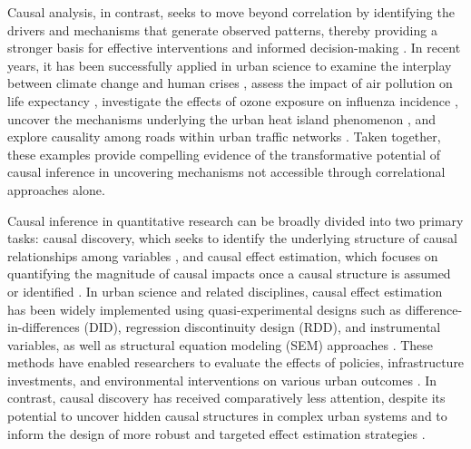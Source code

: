 \documentclass[authoryear,preprint,review,12pt]{elsarticle}
\begin{document}
Causal analysis, in contrast, seeks to move beyond correlation by identifying the drivers and mechanisms that generate observed patterns, thereby providing a stronger basis for effective interventions and informed decision-making \citep{niu2023mobility_intervention_policies,li2025city_carbon,fekete2025urban_transport}. In recent years, it has been successfully applied in urban science to examine the interplay between climate change and human crises \citep{zhang2011climate_change_human_crisis}, assess the impact of air pollution on life expectancy \citep{chen2013air_pollution_life_expectancy}, investigate the effects of ozone exposure on influenza incidence \citep{guo2024ozone_influenza}, uncover the mechanisms underlying the urban heat island phenomenon \citep{zhong2024urban_heat_island}, and explore causality among roads within urban traffic networks \citep{mao2024urban_traffic_networks}. Taken together, these examples provide compelling evidence of the transformative potential of causal inference in uncovering mechanisms not accessible through correlational approaches alone.

Causal inference in quantitative research can be broadly divided into two primary tasks: causal discovery, which seeks to identify the underlying structure of causal relationships among variables \citep{runge2015causal_gateways,runge2019ictsess,runge2023cits}, and causal effect estimation, which focuses on quantifying the magnitude of causal impacts once a causal structure is assumed or identified \citep{pearl1995scm1,pearl2000scm2,rubin1974pom1,rubin1986pom2}. In urban science and related disciplines, causal effect estimation has been widely implemented using quasi-experimental designs such as difference-in-differences (DID), regression discontinuity design (RDD), and instrumental variables, as well as structural equation modeling (SEM) approaches \citep{liu2021quasi_experimental,delgado2015sdid,kolak2019srdd,bowden2015instruments,rosseel2012sem}. These methods have enabled researchers to evaluate the effects of policies, infrastructure investments, and environmental interventions on various urban outcomes \citep{chen2013air_pollution_life_expectancy,jia2021high_speed_rail,li2024protected_areas}. In contrast, causal discovery has received comparatively less attention, despite its potential to uncover hidden causal structures in complex urban systems and to inform the design of more robust and targeted effect estimation strategies \citep{deng2022urban_granger_causality,fekete2025urban_transport,gan2025urban_transfer_entropy}.
\end{document}
